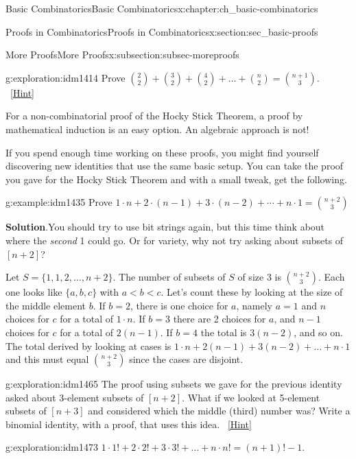 \documentclass[oneside,10pt,]{book}
\numberwithin{equation}{chapter}
\newcommand{\lt}{<}
\begin{document}
\begin{chapterptx}{Basic Combinatorics}{}{Basic Combinatorics}{}{}{x:chapter:ch_basic-combinatorics}
\begin{sectionptx}{Proofs in Combinatorics}{}{Proofs in Combinatorics}{}{}{x:section:sec_basic-proofs}
\begin{subsectionptx}{More Proofs}{}{More Proofs}{}{}{x:subsection:subsec-moreproofs}
\begin{exploration}{}{g:exploration:idm1414}%
Prove \(\binom{2}{2} + \binom{3}{2} + \binom{4}{2} + \ldots + \binom{n}{2} = \binom{n + 1}{3}\).%
\qquad~\hfill{\tiny\hyperlink{g:hint:idm1418-back}{[Hint]}}\end{exploration}
For a non-combinatorial proof of the Hocky Stick Theorem, a proof by mathematical induction is an easy option. An algebraic approach is not!%
\par
If you spend enough time working on these proofs, you might find yourself discovering new identities that use the same basic setup.  You can take the proof you gave for the Hocky Stick Theorem and with a small tweak, get the following.%
\begin{example}{}{g:example:idm1435}%
Prove \(1\cdot n + 2 \cdot (n-1) + 3 \cdot (n-2) + \cdots + n \cdot 1 = \binom{n+2}{3}\)%
\par\smallskip%
\noindent\textbf{Solution}.\hypertarget{g:solution:idm1439}{}\quad{}You should try to use bit strings again, but this time think about where the \emph{second} 1 could go.  Or for variety, why not try asking about subsets of \([n+2]\)?%
\par
Let \(S = \{1,1,2,\ldots,n + 2\}\). The number of subsets of \(S\) of size 3 is \(\binom{n + 2}{3}\). Each one looks like \(\{a, b, c\}\) with \(a \lt b \lt c\). Let's count these by looking at the size of the middle element \(b\). If \(b=2\), there is one choice for \(a\), namely \(a=1\) and \(n\) choices for \(c\) for a total of \(1 \cdot n\). If \(b=3\) there are 2 choices for \(a\), and \(n - 1\) choices for \(c\) for a total of \(2(n - 1)\). If \(b=4\) the total is \(3(n - 2)\), and so on. The total derived by looking at cases is \(1 \cdot n + 2\left( n - 1 \right) + 3\left( n - 2 \right) + \ldots + n \cdot 1\) and this must equal \(\binom{n + 2}{3}\) since the cases are disjoint.%
\end{example}
\begin{exploration}{}{g:exploration:idm1465}%
The proof using subsets we gave for the previous identity asked about 3-element subsets of \([n+2]\).  What if we looked at 5-element subsets of \([n+3]\) and considered which the middle (third) number was?  Write a binomial identity, with a proof, that uses this idea.%
\qquad~\hfill{\tiny\hyperlink{g:hint:idm1470-back}{[Hint]}}\end{exploration}
\begin{exploration}{}{g:exploration:idm1473}%
\(1 \cdot 1! + 2 \cdot 2! + 3 \cdot 3! + \ldots + n \cdot n! = \left( n + 1 \right)! - 1\).%

\end{exploration}
\end{subsectionptx}
\end{sectionptx}
\end{chapterptx}
\end{document}
